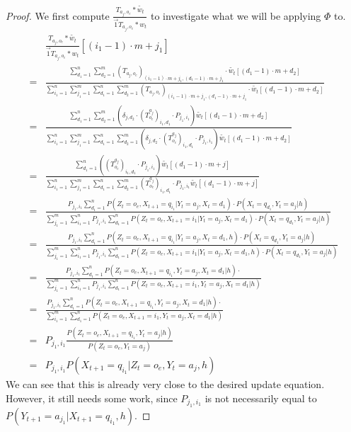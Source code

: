 \documentclass{article}
\theoremstyle{definition}
\begin{document}
\begin{proof}
We first compute $\frac{T_{a_j,o_e}*\widetilde{w_t}}{\vec{1} T_{a_j,o_e}*w_t}$ to investigate what we will be applying $\Phi$ to.
\begin{align*}
&\frac{T_{a_j,o_e}*\widetilde{w_t}}{\vec{1} T_{a_j,o_e}*w_t}[(i_1-1) \cdot m+j_1]\\
 =&\frac{\sum\limits_{d_1=1}^{n} \sum\limits_{d_2=1}^{m} (T_{a_j,o_e})_{(i_1-1) \cdot m+j_1,(d_1-1) \cdot m+j_1}\cdot \widetilde{w_t}[(d_1-1) \cdot m+d_2]}{\sum\limits_{i_1=1}^n \sum\limits_{j_1=1}^{m} \sum\limits_{d_1=1}^{n} \sum\limits_{d_2=1}^{m} (T_{a_j,o_e})_{(i_1-1) \cdot m+j_1,(d_1-1) \cdot m+j_1}\cdot \widetilde{w_t}[(d_1-1) \cdot m+d_2]} \\
=&\frac{\sum\limits_{d_1=1}^{n} \sum\limits_{d_2=1}^{m} (\delta_{j,d_2}\cdot (T^{a_j}_{o_e})_{i_1,d_1}\cdot P_{j_1,i_1}) \widetilde{w_t}[(d_1-1) \cdot m+d_2]}{\sum\limits_{i_1=1}^n \sum\limits_{j_1=1}^{m} \sum\limits_{d_1=1}^{n} \sum\limits_{d_2=1}^{m} (\delta_{j,d_2}\cdot (T^{a_j}_{o_e})_{i_1,d_1}\cdot P_{j_1,i_1}) \widetilde{w_t}[(d_1-1) \cdot m+d_2]} \\
=&\frac{\sum\limits_{d_1=1}^{n} ( (T^{a_j}_{o_e})_{i_1,d_1}\cdot P_{j_1,i_1}) \widetilde{w_t}[(d_1-1) \cdot m+j]}{\sum\limits_{i_1=1}^n \sum\limits_{j_1=1}^{m} \sum\limits_{d_1=1}^{n} \sum\limits_{d_2=1}^{m} (T^{a_j}_{o_e})_{i_1,d_1}\cdot P_{j_1,i_1} \widetilde{w_t}[(d_1-1) \cdot m+j]} \\
=&\frac{P_{j_1,i_1}\sum\limits_{d_1=1}^n P(Z_t=o_e,X_{t+1}=q_{i_1}|Y_t=a_j,X_t=d_1)\cdot P(X_t=q_{d_1},Y_t={a_j}|h)}{\sum\limits_{j_1=1}^{m} \sum\limits_{i_1=1}^{n} P_{j_1,i_1}\sum\limits_{d_1=1}^n P(Z_t=o_e,X_{t+1}=i_1|Y_t=a_j,X_t=d_1)\cdot P(X_t=q_{d_1},Y_t={a_j}|h)}\\
=&\frac{P_{j_1,i_1}\sum\limits_{d_1=1}^n P(Z_t=o_e,X_{t+1}=q_{i_1}|Y_t=a_j,X_t=d_1,h)\cdot P(X_t=q_{d_1},Y_t={a_j}|h)}{\sum\limits_{j_1=1}^{m} \sum\limits_{i_1=1}^{n} P_{j_1,i_1}\sum\limits_{d_1=1}^n P(Z_t=o_e,X_{t+1}=i_1|Y_t=a_j,X_t=d_1,h)\cdot P(X_t=q_{d_1},Y_t={a_j}|h)} \\
=&\frac{P_{j_1,i_1}\sum\limits_{d_1=1}^n P(Z_t=o_e,X_{t+1}=q_{i_1},Y_t=a_j,X_t=d_1|h)\cdot}{\sum\limits_{j_1=1}^{m} \sum\limits_{i_1=1}^{n} P_{j_1,i_1}\sum\limits_{d_1=1}^n P(Z_t=o_e,X_{t+1}=i_1,Y_t=a_j,X_t=d_1|h)} \\
=&\frac{P_{j_1,i_1}\sum\limits_{d_1=1}^n P(Z_t=o_e,X_{t+1}=q_{i_1},Y_t=a_j,X_t=d_1|h)\cdot}{\sum\limits_{i_1=1}^{m} \sum\limits_{d_1=1}^n P(Z_t=o_e,X_{t+1}=i_1,Y_t=a_j,X_t=d_1|h)} \\
=&P_{j_1,i_1} \frac{P(Z_t=o_e,X_{t+1}=q_{i_1},Y_t=a_j|h)}{P(Z_t=o_e,Y_t=a_j)} \\
=&P_{j_1,i_1} P(X_{t+1}=q_{i_1}|Z_t=o_e,Y_t=a_j,h)
\end{align*}
We can see that this is already very close to the desired update equation. However, it still needs some work, since $P_{j_1,i_1}$ is not necessarily equal to $P(Y_{t+1}=a_{j_1}|X_{t+1}=q_{i_1},h)$. 


\end{proof}
\end{document}
